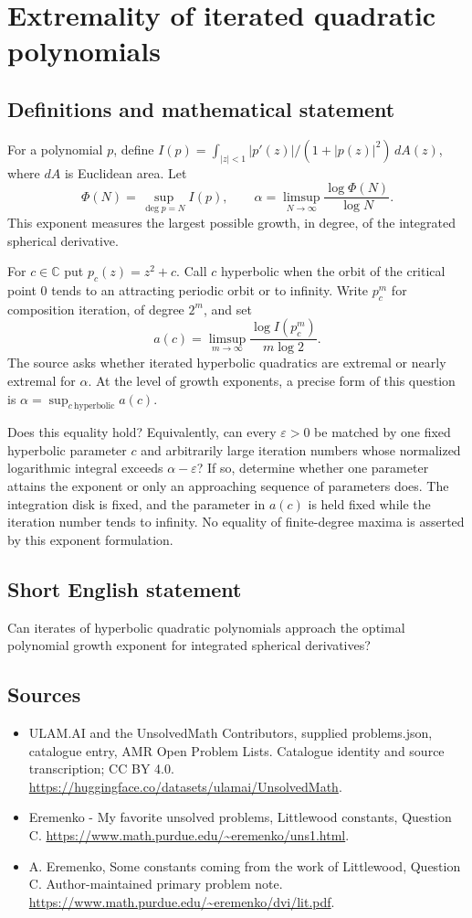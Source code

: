 \documentclass[11pt,a4paper]{article}
\begin{document}
\section*{Extremality of iterated quadratic polynomials}\label{statement}

\subsection{Definitions and mathematical statement}
For a polynomial $p$, define
$I(p)=\int_{|z|<1}|p'(z)|/(1+|p(z)|^2)\,dA(z)$,
where $dA$ is Euclidean area. Let
\[
 \Phi(N)=\sup_{\deg p=N}I(p),\qquad
 \alpha=\limsup_{N\to\infty}\frac{\log\Phi(N)}{\log N}.
\]
This exponent measures the largest possible growth,
in degree, of the integrated spherical derivative.

For $c\in\mathbb C$ put $p_c(z)=z^2+c$.
Call $c$ hyperbolic when the orbit of the critical
point $0$ tends to an attracting periodic orbit
or to infinity. Write $p_c^m$ for composition
iteration, of degree $2^m$, and set
\[
 a(c)=\limsup_{m\to\infty}
                    \frac{\log I(p_c^m)}{m\log2}.
\]
The source asks whether iterated hyperbolic quadratics
are extremal or nearly extremal for $\alpha$.
At the level of growth exponents, a precise form
of this question is
$\alpha=\sup_{c\ \mathrm{hyperbolic}}a(c)$.

Does this equality hold? Equivalently, can every
$\varepsilon>0$ be matched by one fixed hyperbolic
parameter $c$ and arbitrarily large iteration numbers
whose normalized logarithmic integral exceeds
$\alpha-\varepsilon$? If so, determine whether one
parameter attains the exponent or only an approaching
sequence of parameters does.
The integration disk is fixed, and the parameter
in $a(c)$ is held fixed while the iteration number
tends to infinity. No equality of finite-degree
maxima is asserted by this exponent formulation.
\subsection{Short English statement}
Can iterates of hyperbolic quadratic polynomials approach the optimal polynomial growth exponent for integrated spherical derivatives?
\subsection{Sources}
\begin{itemize}
\item[S1] ULAM.AI and the UnsolvedMath Contributors, supplied problems.json, catalogue entry, AMR Open Problem Lists. Catalogue identity and source transcription; CC BY 4.0.
\url{https://huggingface.co/datasets/ulamai/UnsolvedMath}.
\item[S2] Eremenko - My favorite unsolved problems, Littlewood constants, Question C. 
\url{https://www.math.purdue.edu/~eremenko/uns1.html}.
\item[S3] A. Eremenko, Some constants coming from the work of Littlewood, Question C. Author-maintained primary problem note.
\url{https://www.math.purdue.edu/~eremenko/dvi/lit.pdf}.
\end{itemize}
\end{document}
